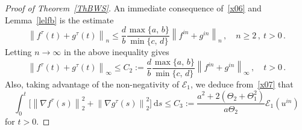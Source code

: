 \documentclass[10pt]{amsart}
\theoremstyle{definition}\newtheorem{defi}[theo]{Definition}\newtheorem{rema}[theo]{Remark}\newtheorem{exam}[theo]{Example}\newtheorem{exem}[theo]{Example}\newtheorem{nota}[theo]{Notation}
\newcommand{\clE}{\mathcal{E}}
\newcommand{\rmd}{\mathrm{d}}
\begin{document}
\begin{proof}[Proof of Theorem~\ref{ThBWS}]
An immediate consequence of~\eqref{x06} and Lemma~\ref{lelfb} is the estimate
\begin{equation*}
\left\|f^\tau(t)+g^\tau(t)\right\|_n \le \frac{d}{b}\frac{\max\{a,\,b\}}{\min\{c,\, d\}}\left\|f^{in}+g^{in}\right\|_n\,, \quad n\ge 2\,, \ t>0\,.
\end{equation*}
Letting $n\to\infty$ in the above inequality gives
\begin{equation}\label{x08}
\left\|f^\tau(t)+g^\tau(t)\right\|_\infty \le C_2 := \frac{d}{b}\frac{\max\{a,\,b\}}{\min\{c,\, d\}} \left\|f^{in}+g^{in}\right\|_\infty\,, \quad t>0\,.
\end{equation}
Also, taking advantage of the non-negativity of $\clE_1$, we deduce from~\eqref{x07} that
\begin{equation}\label{x09}
\int_0^t \big[\left\|\nabla f^\tau(s)\right\|_2^2 + \left\|\nabla g^\tau(s)\right\|_2^2 \big]\ \rmd s\le C_3
:= \frac{a^2+2\left(\Theta_2+\Theta_1^2\right)}{a\Theta_2} \clE_1(u^{in})
\end{equation} 
for $t>0$.


\end{proof}
\end{document}
